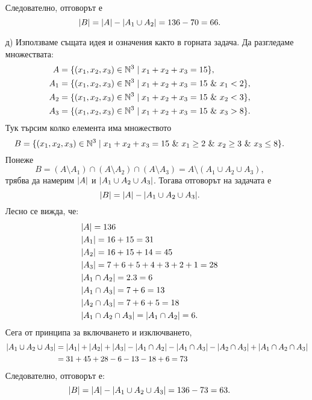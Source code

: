 \begin{solution}
\begin{enumerate}[a)]
    Следователно, отговорът е 
    \[\lvert{B}\rvert = \lvert{A}\rvert - \lvert{A_1 \cup A_2}\rvert = 136 - 70 = 66.\]
  \item[д)]
    Използваме същата идея и означения както в горната задача.
    Да разгледаме множествата:
    \begin{align*}
      A & = \{(x_1,x_2,x_3) \in \Nat^3\mid x_1 + x_2 + x_3 = 15\},\\
      A_1 & = \{(x_1,x_2,x_3) \in \Nat^3\mid x_1 + x_2 + x_3 = 15\ \&\ x_1 < 2\},\\
      A_2 & = \{(x_1,x_2,x_3) \in \Nat^3\mid x_1 + x_2 + x_3 = 15\ \&\ x_2 < 3\},\\
      A_3 & = \{(x_1,x_2,x_3) \in \Nat^3\mid x_1 + x_2 + x_3 = 15\ \&\ x_3 > 8\}.
    \end{align*}
    Тук търсим колко елемента има множеството
    \[B = \{(x_1,x_2,x_3) \in \mathbb{N}^3\mid x_1 + x_2 + x_3 = 15\ \&\ x_1 \geq 2\ \&\ x_2 \geq 3\ \&\ x_3 \leq 8\}.\]
    Понеже
    \[B = (A \setminus A_1) \cap (A\setminus A_2) \cap (A\setminus A_3) = A \setminus (A_1 \cup A_2 \cup A_3),\]
    трябва да намерим $\lvert{A}\rvert$ и $\lvert{A_1 \cup A_2 \cup A_3}\rvert$.
    Тогава отговорът на задачата е 
    \[\lvert{B}\rvert = \lvert{A}\rvert - \lvert{A_1 \cup A_2 \cup A_3}\rvert.\]
    Лесно се вижда, че:
    \begin{align*}
      & \lvert{A}\rvert  = 136\\
      & \lvert{A_1}\rvert = 16 + 15 = 31\\
      & \lvert{A_2}\rvert = 16 + 15 + 14 = 45\\
      & \lvert{A_3}\rvert = 7 + 6 + 5 + 4 + 3 + 2 + 1 = 28\\
      & \lvert{A_1\cap A_2}\rvert = 2.3 = 6\\
      & \lvert{A_1\cap A_3}\rvert  = 7 + 6 = 13\\
      & \lvert{A_2\cap A_3}\rvert  = 7 + 6 + 5 = 18\\
      & \lvert{A_1\cap A_2\cap A_3}\rvert = \lvert{A_1 \cap A_2}\rvert = 6.
    \end{align*}
    Сега от принципа за включването и изключването, 
    \begin{align*}
      \lvert{A_1 \cup A_2 \cup A_3}\rvert & = \lvert{A_1}\rvert + \lvert{A_2}\rvert + \lvert{A_3}\rvert - \lvert{A_1 \cap A_2}\rvert - \lvert{A_1 \cap A_3}\rvert - \lvert{A_2 \cap A_3}\rvert + \lvert{A_1 \cap A_2 \cap A_3}\rvert\\
      & = 31 + 45 + 28 - 6 - 13 - 18 + 6 = 73
    \end{align*}
    Следователно, отговорът е:
    \[\lvert{B}\rvert = \lvert{A}\rvert - \lvert{A_1\cup A_2 \cup A_3}\rvert = 136 - 73 = 63.\]
  \end{enumerate}
\end{solution}

